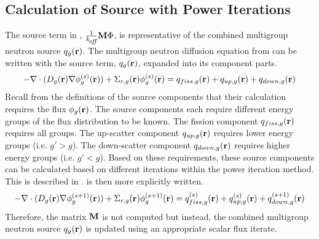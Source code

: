   \subsection{Calculation of Source with Power Iterations}
  \label{sec:calculation_of_source_with_power_iterations}
    The source term in , $\frac{1}{k_{\!\mbox{\scriptsize \em eff}}} \mathbf{M} \Phi$, is
    representative of the combined multigroup neutron source $q_g(\mathbf{r})$.  The
    multigroup neutron diffusion equation from  can
    be written with the source term, $q_g(\mathbf{r})$, expanded into its component
    parts.
    \begin{equation} 
      \label{eq:multigroup_source_expand}
      -\mathbf{\nabla} \cdot (D_g(\mathbf{r}) \mathbf{\nabla} \phi_g^{(s)}(\mathbf{r})) + \Sigma_{r,g}(\mathbf{r})
      \phi_g^{(s)}(\mathbf{r}) = q_{fiss,g}(\mathbf{r}) + q_{up,g}(\mathbf{r}) + q_{down,g}(\mathbf{r})
    \end{equation}
    Recall from the definitions of the source components that their calculation
    requires the flux $\phi_g(\mathbf{r})$. The source components each require
    different energy groups of the flux distribution to be known. The fission
    component $q_{fiss,g}(\mathbf{r})$ requires all groups. The up-scatter component
    $q_{up,g}(\mathbf{r})$ requires lower energy groups (i.e. $g' > g$). The
    down-scatter component $q_{down,g}(\mathbf{r})$ requires higher energy groups (i.e.
    $g' < g$). Based on these requirements, these source components can be
    calculated based on different iterations within the power iteration method.
    This is described in .
     is then more explicitly written.
    \begin{equation} 
      \label{eq:multigroup_power_iterations}
      -\mathbf{\nabla} \cdot (D_g(\mathbf{r}) \mathbf{\nabla} \phi_g^{(s+1)}(\mathbf{r})) + \Sigma_{r,g}(\mathbf{r})
      \phi_g^{(s+1)}(\mathbf{r}) = q_{fiss,g}^{(s)}(\mathbf{r}) + q_{up,g}^{(s)}(\mathbf{r}) +
      q_{down,g}^{(s+1)}(\mathbf{r})
    \end{equation}
    Therefore, the matrix $\mathbf{M}$ is not computed but instead, the combined
    multigroup neutron source $q_g(\mathbf{r})$ is updated using an appropriate scalar
    flux iterate.

